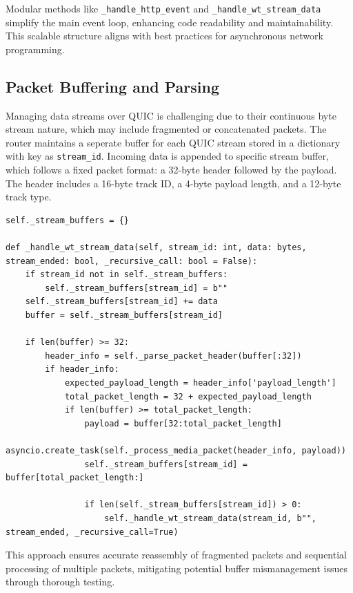 Modular methods like \texttt{\_handle\_http\_event} and \texttt{\_handle\_wt\_stream\_data} simplify the main event loop, enhancing code readability and maintainability. This scalable structure aligns with best practices for asynchronous network programming.

\subsection{Packet Buffering and Parsing}
Managing data streams over QUIC is challenging due to their continuous byte stream nature, which may include fragmented or concatenated packets. The router maintains a seperate buffer for each QUIC stream stored in a dictionary with key as \texttt{stream\_id}. Incoming data is appended to specific stream buffer, which follows a fixed packet format: a 32-byte header followed by the payload. The header includes a 16-byte track ID, a 4-byte payload length, and a 12-byte track type.

\begin{lstlisting}[breaklines=true,basicstyle=\small\ttfamily,frame=single]
self._stream_buffers = {}

def _handle_wt_stream_data(self, stream_id: int, data: bytes, stream_ended: bool, _recursive_call: bool = False):
    if stream_id not in self._stream_buffers:
        self._stream_buffers[stream_id] = b""
    self._stream_buffers[stream_id] += data
    buffer = self._stream_buffers[stream_id]

    if len(buffer) >= 32:
        header_info = self._parse_packet_header(buffer[:32])
        if header_info:
            expected_payload_length = header_info['payload_length']
            total_packet_length = 32 + expected_payload_length
            if len(buffer) >= total_packet_length:
                payload = buffer[32:total_packet_length]
                asyncio.create_task(self._process_media_packet(header_info, payload))
                self._stream_buffers[stream_id] = buffer[total_packet_length:]

                if len(self._stream_buffers[stream_id]) > 0:
                    self._handle_wt_stream_data(stream_id, b"", stream_ended, _recursive_call=True)
\end{lstlisting}

This approach ensures accurate reassembly of fragmented packets and sequential processing of multiple packets, mitigating potential buffer mismanagement issues through thorough testing.

